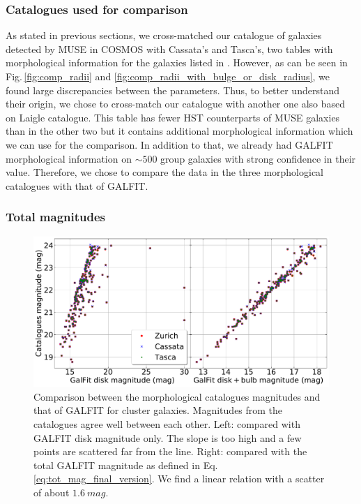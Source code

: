 \subsubsection{Catalogues used for comparison}

As stated in previous sections, we cross-matched our catalogue of galaxies detected by MUSE in COSMOS with Cassata's and Tasca's, two tables with morphological information for the galaxies listed in . However, as can be seen in Fig.\,\ref{fig:comp_radii} and \ref{fig:comp_radii_with_bulge_or_disk_radius}, we found large discrepancies between the parameters. Thus, to better understand their origin, we chose to cross-match our catalogue with another one also based on Laigle catalogue. This table has fewer HST counterparts of MUSE galaxies than in the other two but it contains additional morphological information which we can use for the comparison. In addition to that, we already had GALFIT morphological information on $\sim 500$ group galaxies with strong confidence in their value. Therefore, we chose to compare the data in the three morphological catalogues with that of GALFIT.

\subsubsection{Total magnitudes}

\begin{figure}[htbp]
	\includegraphics[width=\linewidth]{../Plots/catalogMag_against_GalfitMag_corrected.pdf}
	\caption[Comparison between magnitudes]{Comparison between the morphological catalogues magnitudes and that of GALFIT for cluster galaxies. Magnitudes from the catalogues agree well between each other. Left: compared with GALFIT disk magnitude only. The slope is too high and a few points are scattered far from the line. Right: compared with the total GALFIT magnitude as defined in Eq.\,\ref{eq:tot_mag_final_version}. We find a linear relation with a scatter of about $\SI{1.6}{mag}$.}
	\label{fig:comp_mags}
\end{figure}

